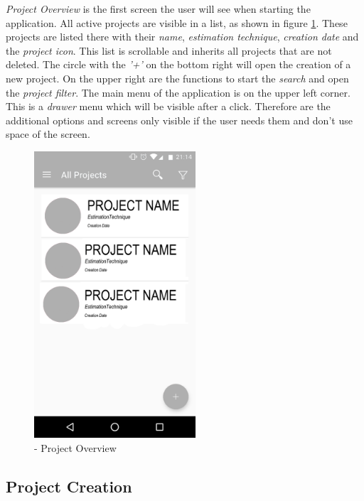 \textit{Project Overview} is the first screen the user will see when starting the application. All active projects are visible in a list, as shown in figure \ref{fig:appOverview}. These projects are listed there with their \textit{name}, \textit{estimation technique}, \textit{creation date} and the \textit{project icon}. This list is scrollable and inherits all projects that are not deleted. The circle with the \textit{'+'} on the bottom right will open the creation of a new project. On the upper right are the functions to start the \textit{search} and open the \textit{project filter}. The main menu of the application is on the upper left corner. This is a \textit{drawer} menu which will be visible after a click. Therefore are the additional options and screens only visible if the user needs them and don't use space of the screen.\newpage
\begin{figure}[h] 
	\centering 
	\includegraphics[width=6cm]{images/projectoverview.png} 
	\caption{- Project Overview} 
	\label{fig:appOverview}
\end{figure}
\subsection{Project Creation}

